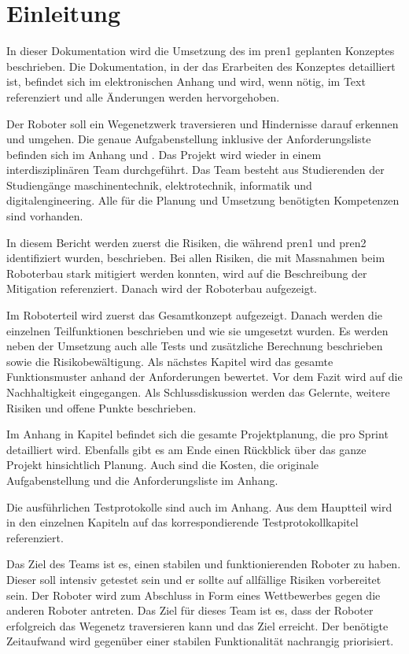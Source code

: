 \section{Einleitung}

In dieser Dokumentation wird die Umsetzung des im \acrfull{pren1} geplanten Konzeptes beschrieben. 
Die Dokumentation, in der das Erarbeiten des Konzeptes detailliert ist, befindet sich im elektronischen Anhang und wird, wenn nötig, im Text referenziert und alle Änderungen werden hervorgehoben.

Der Roboter soll ein Wegenetzwerk traversieren und Hindernisse darauf erkennen und umgehen. Die genaue Aufgabenstellung inklusive der Anforderungsliste befinden sich im Anhang  und . Das Projekt wird wieder in einem interdisziplinären Team durchgeführt. Das Team besteht aus Studierenden der Studiengänge \acrfull{maschinentechnik}, \acrfull{elektrotechnik}, \acrfull{informatik} und \acrfull{digitalengineering}. Alle für die Planung und Umsetzung benötigten Kompetenzen sind vorhanden.


In diesem Bericht werden zuerst die Risiken, die während \acrshort{pren1} und \acrshort{pren2} identifiziert wurden, beschrieben. Bei allen Risiken, die mit Massnahmen beim Roboterbau stark mitigiert werden konnten, wird auf die Beschreibung der Mitigation referenziert. Danach wird der Roboterbau aufgezeigt.

Im Roboterteil wird zuerst das Gesamtkonzept aufgezeigt. Danach werden die einzelnen Teilfunktionen beschrieben und wie sie umgesetzt wurden. Es werden neben der Umsetzung auch alle Tests und zusätzliche Berechnung beschrieben sowie die Risikobewältigung. 
Als nächstes Kapitel wird das gesamte Funktionsmuster anhand der Anforderungen bewertet. Vor dem Fazit wird auf die Nachhaltigkeit eingegangen. Als Schlussdiskussion werden das Gelernte, weitere Risiken und offene Punkte beschrieben.

Im Anhang in Kapitel  befindet sich die gesamte Projektplanung, die pro Sprint detailliert wird. Ebenfalls gibt es am Ende einen Rückblick über das ganze Projekt hinsichtlich Planung. Auch sind die Kosten, die originale Aufgabenstellung und die Anforderungsliste im Anhang.

Die ausführlichen Testprotokolle sind auch im Anhang. Aus dem Hauptteil wird in den einzelnen Kapiteln auf das korrespondierende Testprotokollkapitel referenziert.


Das Ziel des Teams ist es, einen stabilen und funktionierenden Roboter zu haben. Dieser soll intensiv getestet sein und er sollte auf allfällige Risiken vorbereitet sein. Der Roboter wird zum Abschluss in Form eines Wettbewerbes gegen die anderen Roboter antreten. Das Ziel für dieses Team ist es, dass der Roboter erfolgreich das Wegenetz traversieren kann und das Ziel erreicht. Der benötigte Zeitaufwand wird gegenüber einer stabilen Funktionalität nachrangig priorisiert.
